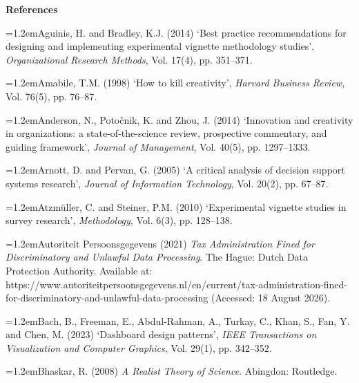 \documentclass[12pt,a4paper]{article}
\begin{document}
\newpage
{}\label{toc:refs}
\begin{center}{\large\bfseries References}\end{center}
\vspace{10pt}

{
\setlength{\parskip}{7pt}
\newcommand{\rf}{\par\hangindent=1.2em\noindent}

\rf Aguinis, H. and Bradley, K.J. (2014) `Best practice recommendations for designing and implementing experimental vignette methodology studies', \emph{Organizational Research Methods}, Vol. 17(4), pp. 351--371.

\rf Amabile, T.M. (1998) `How to kill creativity', \emph{Harvard Business Review}, Vol. 76(5), pp. 76--87.

\rf Anderson, N., Potočnik, K. and Zhou, J. (2014) `Innovation and creativity in organizations: a state-of-the-science review, prospective commentary, and guiding framework', \emph{Journal of Management}, Vol. 40(5), pp. 1297--1333.

\rf Arnott, D. and Pervan, G. (2005) `A critical analysis of decision support systems research', \emph{Journal of Information Technology}, Vol. 20(2), pp. 67--87.

\rf Atzmüller, C. and Steiner, P.M. (2010) `Experimental vignette studies in survey research', \emph{Methodology}, Vol. 6(3), pp. 128--138.

\rf Autoriteit Persoonsgegevens (2021) \emph{Tax Administration Fined for Discriminatory and Unlawful Data Processing}. The Hague: Dutch Data Protection Authority. Available at: https://www.autoriteitpersoonsgegevens.nl/en/current/tax-administration-fined-for-discriminatory-and-unlawful-data-processing (Accessed: 18 August 2026).

\rf Bach, B., Freeman, E., Abdul-Rahman, A., Turkay, C., Khan, S., Fan, Y. and Chen, M. (2023) `Dashboard design patterns', \emph{IEEE Transactions on Visualization and Computer Graphics}, Vol. 29(1), pp. 342--352.

\rf Bhaskar, R. (2008) \emph{A Realist Theory of Science}. Abingdon: Routledge.

}
\end{document}
